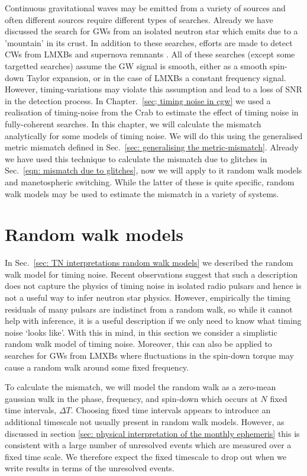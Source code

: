 \documentclass[../full_thesis/full_thesis.tex]{subfiles}
\begin{document}
Continuous gravitational waves may be emitted from a variety of sources and
often different sources require different types of searches.  Already we have
discussed the search for GWs from an isolated neutron star which emits due to a
'mountain' in its crust. In addition to these searches, efforts are made to
detect CWs from LMXBs \citep{ligo2015scox1} and supernova remnants
\citep{LIGO_SNR2015}. All of these searches (except some targetted searches)
assume the GW signal is smooth, either as a smooth spin-down Taylor expansion,
or in the case of LMXBs a constant frequency signal. However, timing-variations
may violate this assumption and lead to a loss of SNR in the detection process.
In Chapter.~\ref{sec; timing noise in cgw} we used a realisation of
timing-noise from the Crab to estimate the effect of timing noise in
fully-coherent searches. In this chapter, we will calculate the mismatch
analytically for some models of timing noise. We will do this using the
generalised metric mismatch defined in Sec.~\ref{sec: generalising the
metric-mismatch}. Already we have used this technique to calculate the mismatch
due to glitches in Sec.~\eqref{eqn: mismatch due to glitches}, now we will
apply to it random walk models and manetospheric switching. While the latter of
these is quite specific, random walk models may be used to estimate the
mismatch in a variety of systems.

\section{Random walk models}
\label{sec: random walk models}

In Sec.~\ref{sec: TN interpretations random walk models} we described the
random walk model for timing noise. Recent observations \citep{Hobbs2010}
suggest that such a description does not capture the physics of timing noise
in isolated radio pulsars and hence is not a useful way to infer neutron star
physics. However, empirically the timing residuals of many pulsars are indistinct
from a random walk, so while it cannot help with inference, it is a useful
description if we only need to know what timing noise `looks like'. With this
in mind, in this section we consider a simplistic random walk model of timing noise.
Moreover, this can also be applied to searches for GWs from LMXBs where
fluctuations in the spin-down torque may cause a random walk around some fixed
frequency.

To calculate the mismatch, we will model the random walk as a zero-mean
gaussian walk in the phase, frequency, and spin-down which occurs at $N$ fixed
time intervals, $\Delta T$. Choosing fixed time intervals appears to introduce
an additional timescale not usually present in random walk models. However, as
discussed in section \ref{sec: physical interpretation of the monthly
ephemeris} this is consistent with a large number of unresolved events which
are measured over a fixed time scale. We therefore expect the fixed timescale
to drop out when we write results in terms of the unresolved events.
\end{document}
